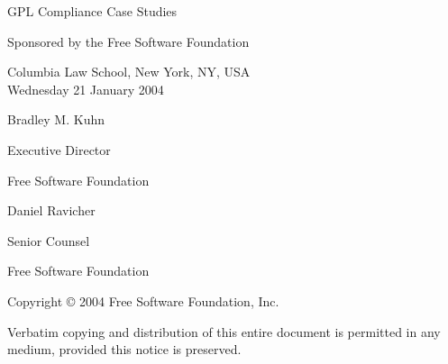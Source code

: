 \documentclass[12pt]{report}
\begin{document}
\begin{titlepage}


\begin{center}

\vspace{.5in}

{\Large {\sc GPL Compliance Case Studies} \\

\vspace{.7in}

Sponsored by the Free Software Foundation \\


\vspace{.3in}

Columbia Law School, New York, NY, USA \\
\vspace{.1in}
Wednesday 21 January 2004
}

\vspace{.7in}

{\large
Bradley M. Kuhn

Executive Director

Free Software Foundation
}

\vspace{.3in}


{\large
Daniel Ravicher

Senior Counsel 

Free Software Foundation
}

\end{center}

\vfill

{\parindent 0in
Copyright \copyright{} 2004 \hspace{.2in} Free Software Foundation, Inc.

\vspace{.3in}

Verbatim copying and distribution of this entire document is permitted in
any medium, provided this notice is preserved.
}

\end{titlepage}

\pagestyle{plain}
\end{document}
